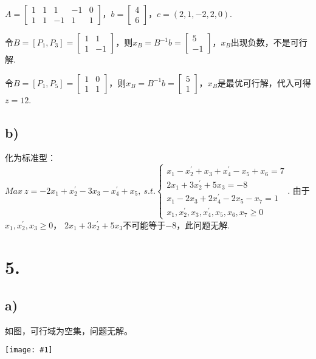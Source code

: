 \documentclass{article}
\newcommand{\p}[1]{\texttt{[image: \#1]}}
\begin{document}
	$A=\begin{bmatrix} 1 & 1 & 1 & -1 & 0 \\ 1 & 1 & -1 & 1 & 1\end{bmatrix}$，$b=\begin{bmatrix} 4 \\ 6\end{bmatrix}$，$c=(2,1,-2,2,0)$.
	
	令$B=[P_1,P_3]=\begin{bmatrix} 1 & 1\\ 1&-1 \end{bmatrix}$，则$x_B=B^{-1}b=\begin{bmatrix} 5 \\ -1\end{bmatrix}$，$x_B$出现负数，不是可行解.
	
	令$B=[P_1,P_5]=\begin{bmatrix} 1 & 0\\ 1&1 \end{bmatrix}$，则$x_B=B^{-1}b=\begin{bmatrix} 5 \\ 1\end{bmatrix}$，$x_B$是最优可行解，代入可得$z=12$.	
	
	\subsection*{b)}

	化为标准型：$Max\ z=-2x_1+x_2^\prime-3x_3-x^\prime_4+x_5,\ s.t. \begin{cases}
	x_1-x_2^\prime+x_3+x_4^\prime-x_5+x_6=7 \\
	2x_1+3x_2^\prime+5x_3=-8 \\
	x_1-2x_3+2x_4^\prime-2x_5-x_7=1 \\
	x_1, x_2^\prime, x_3, x_4^\prime, x_5, x_6, x_7 \geq 0
    \end{cases}$.
    由于$x_1, x_2^\prime, x_3 \geq 0$， $2x_1+3x_2^\prime+5x_3$不可能等于$-8$，此问题无解.
	\section*{5.}
	
	\subsection*{a)}
	
	如图，可行域为空集，问题无解。
	
	\p{5-a}
	
\end{document}
